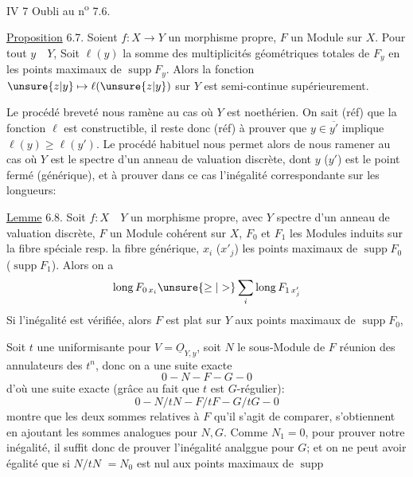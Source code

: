IV 7 Oubli au n\textsuperscript{o} 7.6.

\uline{Proposition} 6.7. Soient $f:X\longrightarrow Y$ un morphisme
  propre,
$F$ un Module  
sur $X$.  Pour tout $y\quad Y$,
Soit $\ell(y)$ la somme des  multiplicités 
géométriques totales  de
$F_y$ en les points maximaux de $\operatorname{supp}F_y$.
Alors la fonction $\unsure{z|y}\mapsto\ell(\unsure{z|y})$ sur
$Y$ est semi-continue supérieurement.

Le procédé breveté nous ramène au cas où $Y$ est noethérien. On sait
(réf) que la fonction $\ell$ est constructible, il reste donc (réf) à prouver
que $y\in\overline{y'}$ implique $\ell(y)\geq\ell(y')$. Le procédé habituel nous permet
alors de nous ramener au cas où $Y$ est le spectre d'un anneau de valuation
discrète, dont $y$ ($y'$) est le point fermé (générique), et 
à prouver dans ce cas l'inégalité correspondante sur les longueurs:

\uline{Lemme} 6.8. Soit $f:X\quad Y$ un morphisme propre, avec $Y$ spectre d'un anneau
de valuation discrète, $F$ un Module cohérent sur $X$, 
$F_0$ et $F_1$ les 
Modules induits sur la fibre spéciale resp. la fibre générique, $x_i$
($x'_j$) les points maximaux de $\operatorname{supp}F_0$ ($\operatorname{supp}F_1$).
Alors on a
\[
\operatorname{long} F_{0\,x_i}\unsure{\geq|>}\sum_i\operatorname{long}F_{1\,x'_j}
\]
Si l'inégalité est vérifiée, alors $F$ est plat sur $Y$ aux points  
maximaux de $\operatorname{supp}F_0$, 

Soit $t$ une uniformisante pour $V=\underline O_{Y,y}$, soit $N$ le sous-Module
de $F$ réunion des annulateurs des $t^n$, donc on a une suite exacte
\[
0\mathrel{-}N\mathrel{-}F\mathrel{-}G\mathrel{-}0
\]
d'où une suite exacte (grâce au fait que $t$ est $G$-régulier):
\[
0\mathrel{-}N/tN\mathrel{-}F/tF\mathrel{-}G/tG\mathrel{-}0
\]
 montre que les deux sommes  relatives à $F$ qu'il s'agit de
comparer, s'obtiennent en ajoutant les sommes analogues pour $N,G$.
Comme $N_1=0$, pour prouver notre inégalité, il suffit donc de
prouver l'inégalité analggue pour $G$; et on ne peut avoir égalité
que si $N/tN$  $=N_0$ est nul aux points maximaux de $\operatorname{supp}$
\unsure{$\cdots$}

